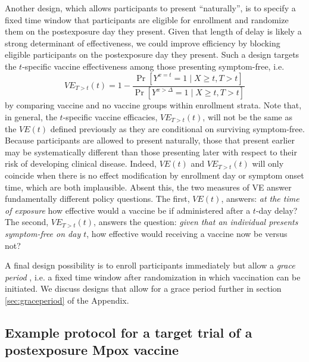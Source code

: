 \documentclass[11pt]{article}
\begin{document}
Another design, which allows participants to present ``naturally'', is to specify a fixed time window that participants are eligible for enrollment and randomize them on the postexposure day they present. Given that length of delay is likely a strong determinant of effectiveness, we could improve efficiency by blocking eligible participants on the postexposure day they present. Such a design targets the $t$-specific vaccine effectiveness among those presenting symptom-free, i.e.
$$
VE_{T > t}(t) = 1 - \frac{\Pr[Y^{x = t} = 1 \mid X \geq t, T > t]}{\Pr[Y^{x > \Delta} = 1 \mid X \geq t, T > t]}
$$
by comparing vaccine and no vaccine groups within enrollment strata. Note that, in general, the $t$-specific vaccine efficacies, $VE_{T > t}(t)$, will not be the same as the $VE(t)$ defined previously as they are conditional on surviving symptom-free. Because participants are allowed to present naturally, those that present earlier may be systematically different than those presenting later with respect to their risk of developing clinical disease. Indeed, $VE(t)$ and $VE_{T > t}(t)$ will only coincide when there is no effect modification by enrollment day or symptom onset time, which are both implausible. Absent this, the two measures of VE answer fundamentally different policy questions. The first, $VE(t)$, answers: \textit{at the time of exposure} how effective would a vaccine be if administered after a $t$-day delay? The second, $VE_{T > t}(t)$, answers the question: \textit{given that an individual presents symptom-free on day $t$}, how effective would receiving a vaccine now be versus not? 

A final design possibility is to enroll participants immediately but allow a \textit{grace period} \cite{smith_emulation_2022,wanis_role_2022}, i.e. a fixed time window after randomization in which vaccination can be initiated. We discuss designs that allow for a grace period further in section \ref{sec:graceperiod} of the Appendix.

\subsection{Example protocol for a target trial of a postexposure Mpox vaccine}
\end{document}
